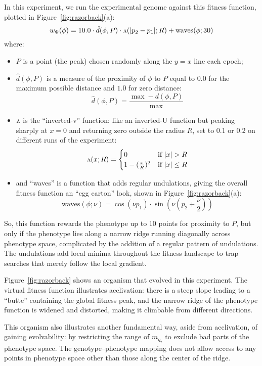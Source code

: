 \documentclass[letterpaper]{article}
\newcommand{\invv}{\ensuremath{\rotatebox[origin=c]{180}{\textrm{v}}}\xspace}
\begin{document}
In this experiment, we run the experimental genome against this fitness
function, plotted in Figure~\ref{fig:razorback}(a):
\[
   w_\Phi(\phi) = 10.0 \cdot \hat{d}(\phi, P)
                       \cdot \invv(|p_2 - p_1|; R)
                       + \text{waves}(\phi; 30)
\]
where:
\begin{itemize}
  \item[ ]
    $P$ is a point (the peak) chosen randomly along the $y=x$ line each epoch;

  \item[ ]
$\hat{d}(\phi, P)$ is a measure of the proximity of $\phi$ to $P$ equal to
$0.0$ for the maximum possible distance and $1.0$ for zero distance:
\[
  \hat{d}(\phi, P) = \frac{\max - d(\phi, P)}{\max}
\]

  \item[ ]
    \invv is the ``inverted-v'' function: like an inverted-U function but
    peaking sharply at $x=0$ and returning zero outside the radius $R$, set to
    0.1 or 0.2 on different runs of the experiment:
\[
   \invv(x; R) =
   \begin{cases}
      0 & \text{if } |x|>R \\
      1 - (\frac{x}{R})^2 &
      \text{if } |x|\leq R
   \end{cases}
\]

  \item[ ]
    and ``waves'' is a function that adds regular undulations, giving the
    overall fitness function an ``egg carton'' look, shown in
    Figure~\ref{fig:razorback}(a):
\[
  \text{waves}(\phi; \nu) = \cos(\nu p_1)
                            \cdot
                            \sin(\nu (p_2 + \frac{\nu}{2}))
\]
\end{itemize}

So, this function rewards the phenotype up to 10 points for proximity to
$P$, but only if the phenotype lies along a narrow ridge running diagonally
across phenotype space, complicated by the addition of a regular pattern of
undulations. The undulations add local minima throughout the fitness
landscape to trap searches that merely follow the local gradient.

Figure~\ref{fig:razorback} shows an organism that evolved in this experiment.
The virtual fitness function illustrates acclivation: there is a steep slope
leading to a ``butte'' containing the global fitness peak, and the narrow ridge
of the phenotype function is widened and distorted, making it climbable from
different directions.

This organism also illustrates another fundamental way, aside from
acclivation, of gaining evolvability: by restricting the range of $m_{g_2}$
to exclude bad parts of the phenotype space. The genotype--phenotype mapping
does not allow access to any points in phenotype space other than those along
the center of the ridge.
\end{document}
